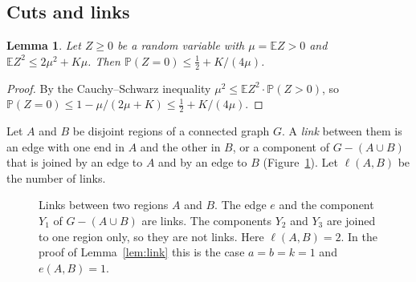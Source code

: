 \documentclass[11pt]{article}
\newtheorem{lemma}[theorem]{Lemma}
\theoremstyle{definition}
\theoremstyle{remark}
\newcommand{\PP}{\mathbb{P}}
\newcommand{\EE}{\mathbb{E}}
\newcommand{\half}{\tfrac12}
\numberwithin{equation}{section}
\begin{document}
\subsection{Cuts and links}

\begin{lemma}\label{lem:second}
Let $Z\ge0$ be a random variable with $\mu=\EE Z>0$ and $\EE Z^{2}\le2\mu^{2}+K\mu$. Then
$\PP(Z=0)\le\half+K/(4\mu)$.
\end{lemma}

\begin{proof}
By the Cauchy--Schwarz inequality $\mu^{2}\le\EE Z^{2}\cdot\PP(Z>0)$, so
$\PP(Z=0)\le1-\mu/(2\mu+K)\le\half+K/(4\mu)$.
\end{proof}

Let $A$ and $B$ be disjoint regions of a connected graph $G$. A \emph{link} between them is an edge
with one end in $A$ and the other in $B$, or a component of $G-(A\cup B)$ that is joined by an edge
to $A$ and by an edge to $B$ (Figure~\ref{fig:links}). Let $\ell(A,B)$ be the number of links.

\begin{figure}[ht]
\centering
{}
\caption{Links between two regions $A$ and $B$. The edge $e$ and the component $Y_1$ of
$G-(A\cup B)$ are links. The components $Y_2$ and $Y_3$ are joined to one region only, so they are
not links. Here $\ell(A,B)=2$. In the proof of Lemma~\ref{lem:link} this is the case $a=b=k=1$
and $e(A,B)=1$.}
\label{fig:links}
\end{figure}
\end{document}
